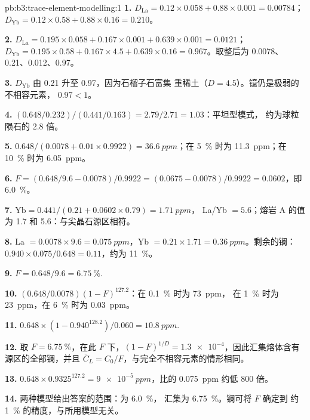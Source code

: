 \begin{solution}{pb:b3:trace-element-modelling:1}
\textbf{1.} $D_{\mathrm{La}} = 0.12\times0.058 + 0.88\times0.001 = 0.00784$；
$D_{\mathrm{Yb}} = 0.12\times0.58 + 0.88\times0.16 = 0.210$。

\textbf{2.} $D_{\mathrm{La}} = 0.195\times0.058 + 0.167\times0.001 +
0.639\times0.001 = 0.0121$；$D_{\mathrm{Yb}} = 0.195\times0.58 +
0.167\times4.5 + 0.639\times0.16 = 0.967$。取整后为 0.0078、0.21、0.012、0.97。

\textbf{3.} $D_{\mathrm{Yb}}$ 由 0.21 升至 0.97，因为石榴子石富集
重稀土（$D = 4.5$）。镱仍是极弱的不相容元素，
$0.97 < 1$。

\textbf{4.} $(0.648/0.232)/(0.441/0.163) = 2.79/2.71 = 1.03$：平坦型模式，
约为球粒陨石的 2.8 倍。

\textbf{5.} $0.648/(0.0078 + 0.01\times0.9922) = \qty{36.6}{ppm}$；在
\qty{5}{\percent} 时为 \qty{11.3}{ppm}；在 \qty{10}{\percent} 时为 \qty{6.05}{ppm}。

\textbf{6.} $F = (0.648/9.6 - 0.0078)/0.9922 = (0.0675 - 0.0078)/0.9922 =
0.0602$，即 \qty{6.0}{\percent}。

\textbf{7.} $\mathrm{Yb} = 0.441/(0.21 + 0.0602\times0.79) = \qty{1.71}{ppm}$，
La/Yb $= 5.6$；熔岩 A 的值为 1.7 和 5.6：与尖晶石源区相符。

\textbf{8.} La $= 0.0078\times9.6 = \qty{0.075}{ppm}$，Yb $= 0.21\times1.71 =
\qty{0.36}{ppm}$。剩余的镧：$0.940\times0.075/0.648 = 0.11$，约为
\qty{11}{\percent}。

\textbf{9.} $F = 0.648/9.6 = \qty{6.75}{\percent}$.

\textbf{10.} $(0.648/0.0078)(1 - F)^{127.2}$：在 \qty{0.1}{\percent} 时为 \qty{73}{ppm}，
在 \qty{1}{\percent} 时为 \qty{23}{ppm}，在
\qty{6}{\percent} 时为 \qty{0.03}{ppm}。

\textbf{11.} $0.648\times(1 - 0.940^{128.2})/0.060 = \qty{10.8}{ppm}$.

\textbf{12.} 取 $F = \qty{6.75}{\percent}$，在此 $F$ 下，$(1 - F)^{1/D} =
\num{1.3e-4}$，因此汇集熔体含有源区的全部镧，并且
$\bar C_L = C_0/F$，与完全不相容元素的情形相同。

\textbf{13.} $0.648\times0.9325^{127.2} = \qty{9e-5}{ppm}$，比的
\qty{0.075}{ppm} 约低 800 倍。

\textbf{14.} 两种模型给出答案的范围：为 \qty{6.0}{\percent}，
汇集为 \qty{6.75}{\percent}。镧可将 $F$ 确定到
约 \qty{1}{\percent} 的精度，与所用模型无关。


\end{solution}
